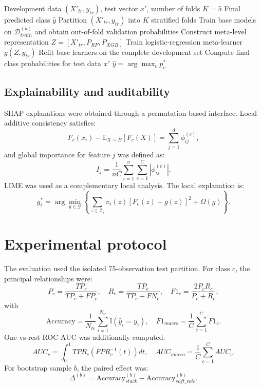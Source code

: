 \documentclass{turkjour}%
\begin{document}
\begin{algorithm}[H]
\caption{Out-of-Fold RF-XGBoost Stacking}
\label{alg:stacking}
\begin{algorithmic}[1]
\Require Development data $(X'_{tr}, y_{tr})$, test vector $x'$, number of folds $K=5$
\Ensure Final predicted class $\hat{y}$
\State Partition $(X'_{tr}, y_{tr})$ into $K$ stratified folds
    \State Train base models on $\mathcal{D}_{train}^{(k)}$ and obtain out-of-fold validation probabilities
\EndFor
\State Construct meta-level representation $Z = [X'_{tr}, P_{RF}, P_{XGB}]$
\State Train logistic-regression meta-learner $g(Z, y_{tr})$
\State Refit base learners on the complete development set
\State Compute final class probabilities for test data $x'$
\State \Return $\hat{y} = \arg \max_c p^*_c$
\end{algorithmic}
\end{algorithm}

\subsection{Explainability and auditability}
SHAP explanations were obtained through a permutation-based interface. Local additive consistency satisfies:
\begin{equation}
F_c(x_i) - \mathbb{E}_{X \sim B}[F_c(X)] = \sum_{j=1}^d \phi_{ij}^{(c)},
\end{equation}
and global importance for feature $j$ was defined as:
\begin{equation}
I_j = \frac{1}{nC} \sum_{i=1}^n \sum_{c=1}^C |\phi_{ij}^{(c)}|.
\end{equation}
LIME was used as a complementary local analysis. The local explanation is:
\begin{equation}
g_i^* = \arg \min_{g \in \mathcal{G}} \left\{ \sum_{z \in \mathcal{Z}_i} \pi_i(z) [F_c(z) - g(z)]^2 + \Omega(g) \right\}.
\end{equation}

\section{Experimental protocol}
The evaluation used the isolated 75-observation test partition. For class $c$, the principal relationships were:
\begin{equation}
P_c = \frac{TP_c}{TP_c + FP_c}, \quad R_c = \frac{TP_c}{TP_c + FN_c}, \quad F1_c = \frac{2P_c R_c}{P_c + R_c};
\end{equation}
with
\begin{equation}
\text{Accuracy} = \frac{1}{N_{te}} \sum_{i=1}^{N_{te}} \mathbb{I}(\hat{y}_i = y_i), \quad F1_{macro} = \frac{1}{C} \sum_{c=1}^C F1_c.
\end{equation}
One-vs-rest ROC-AUC was additionally computed:
\begin{equation}
AUC_c = \int_0^1 TPR_c(FPR_c^{-1}(t)) dt, \quad AUC_{macro} = \frac{1}{C} \sum_{c=1}^C AUC_c.
\end{equation}
For bootstrap sample $b$, the paired effect was:
\begin{equation}
\Delta^{(b)} = \text{Accuracy}_{stack}^{(b)} - \text{Accuracy}_{soft\_vote}^{(b)}.
\end{equation}
\end{document}
